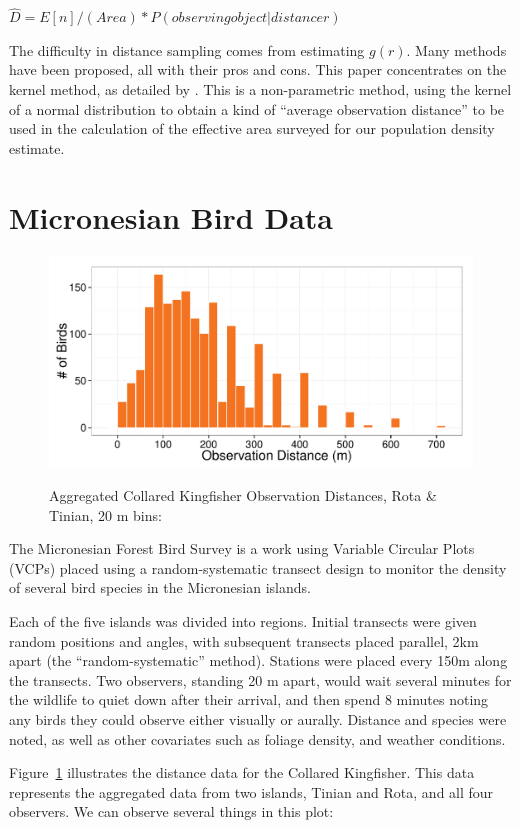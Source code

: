 \documentclass[12pt]{article}
\begin{document}
$\hat{D}=E[n]/(Area)*P(observing object|distance r)$

The difficulty in distance sampling comes from estimating $g(r)$. Many methods have been proposed, all with their pros and cons. This paper concentrates on the kernel method, as detailed by \textcite{quang1993}. This is a non-parametric method, using the kernel of a normal distribution to obtain a kind of ``average observation distance'' to be used in the calculation of the effective area surveyed for our population density estimate.

\section{Micronesian Bird Data}
\begin{figure}
	\caption{Aggregated Collared Kingfisher Observation Distances, Rota \& Tinian, 20 m bins: \cite{micronesian}}
	\includegraphics[width=\textwidth]{../images/histogram_dist_20m.pdf}
	\label{fig:82dist}
\end{figure}
The Micronesian Forest Bird Survey \cite{micronesian} is a work using Variable Circular Plots (VCPs) placed using a random-systematic transect design to monitor the density of several bird species in the Micronesian islands.

Each of the five islands was divided into regions. Initial transects were given random positions and angles, with subsequent transects placed parallel, 2km apart (the ``random-systematic'' method). Stations were placed every 150m along the transects. Two observers, standing 20 m apart, would wait several minutes for the wildlife to quiet down after their arrival, and then spend 8 minutes noting any birds they could observe either visually or aurally. Distance and species were noted, as well as other covariates such as foliage density, and weather conditions. 

Figure~\ref{fig:82dist} illustrates the distance data for the Collared Kingfisher. This data represents the aggregated data from two islands, Tinian and Rota, and all four observers. We can observe several things in this plot:
\end{document}
